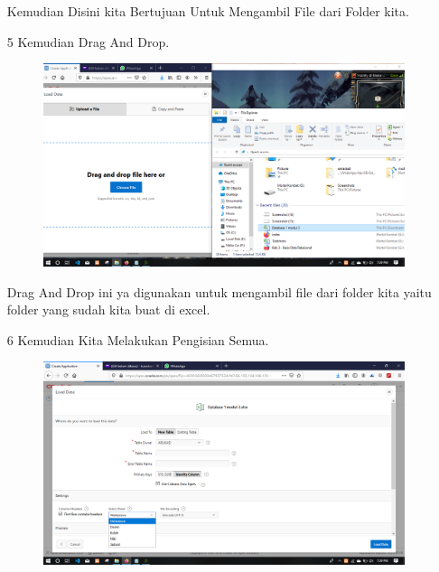 \begin{enumerate}
\par
Kemudian Disini kita Bertujuan Untuk Mengambil File dari Folder kita.

\newpage
\item[5]Kemudian Drag And Drop.

\begin{figure}[!htbp]
    \begin{center}
    \includegraphics[scale=0.2]{figures/04.png}
    \end{center}   
    \end{figure}

\par
Drag And Drop ini ya digunakan untuk mengambil file dari folder kita yaitu folder yang sudah kita buat di excel.

\item[6]Kemudian Kita Melakukan Pengisian Semua.

\begin{figure}[!htbp]
    \begin{center}
    \includegraphics[scale=0.2]{figures/05.png}
    \end{center}   
    \end{figure}


\end{enumerate}
